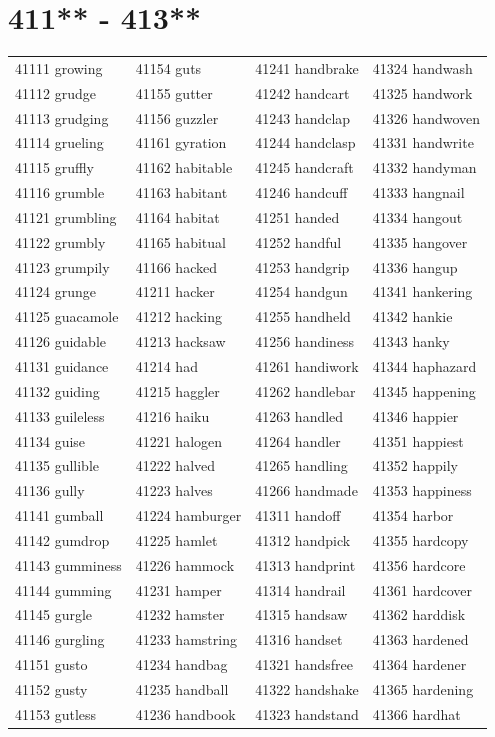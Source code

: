 \documentclass[10pt, oneside]{book}
\begin{document}
\begin{table}
	\centering
	\section*{411** - 413**}
	\begin{tabular}{l l l l}
41111 growing &41154 guts &41241 handbrake &41324 handwash\\
41112 grudge &41155 gutter &41242 handcart &41325 handwork\\
41113 grudging &41156 guzzler &41243 handclap &41326 handwoven\\
41114 grueling &41161 gyration &41244 handclasp &41331 handwrite\\
41115 gruffly &41162 habitable &41245 handcraft &41332 handyman\\
41116 grumble &41163 habitant &41246 handcuff &41333 hangnail\\
41121 grumbling &41164 habitat &41251 handed &41334 hangout\\
41122 grumbly &41165 habitual &41252 handful &41335 hangover\\
41123 grumpily &41166 hacked &41253 handgrip &41336 hangup\\
41124 grunge &41211 hacker &41254 handgun &41341 hankering\\
41125 guacamole &41212 hacking &41255 handheld &41342 hankie\\
41126 guidable &41213 hacksaw &41256 handiness &41343 hanky\\
41131 guidance &41214 had &41261 handiwork &41344 haphazard\\
41132 guiding &41215 haggler &41262 handlebar &41345 happening\\
41133 guileless &41216 haiku &41263 handled &41346 happier\\
41134 guise &41221 halogen &41264 handler &41351 happiest\\
41135 gullible &41222 halved &41265 handling &41352 happily\\
41136 gully &41223 halves &41266 handmade &41353 happiness\\
41141 gumball &41224 hamburger &41311 handoff &41354 harbor\\
41142 gumdrop &41225 hamlet &41312 handpick &41355 hardcopy\\
41143 gumminess &41226 hammock &41313 handprint &41356 hardcore\\
41144 gumming &41231 hamper &41314 handrail &41361 hardcover\\
41145 gurgle &41232 hamster &41315 handsaw &41362 harddisk\\
41146 gurgling &41233 hamstring &41316 handset &41363 hardened\\
41151 gusto &41234 handbag &41321 handsfree &41364 hardener\\
41152 gusty &41235 handball &41322 handshake &41365 hardening\\
41153 gutless &41236 handbook &41323 handstand &41366 hardhat\\
	\end{tabular}
 \end{table}
\clearpage
\end{document}
